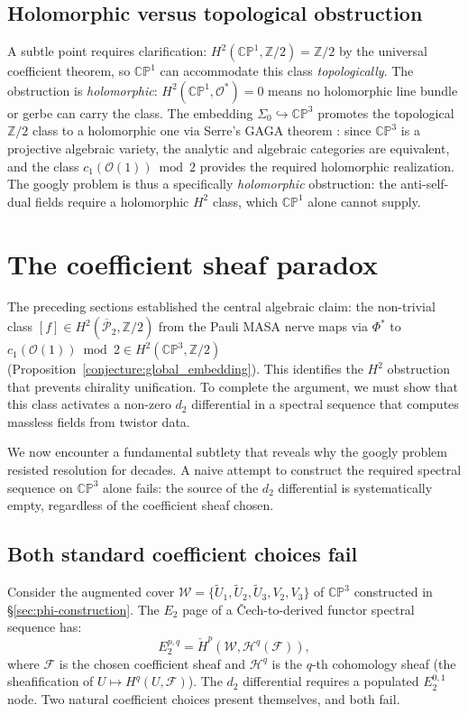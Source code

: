 \documentclass[11pt,a4paper]{article}
\theoremstyle{remark}
\newcommand{\CP}{\mathbb{CP}}
\newcommand{\Z}{\mathbb{Z}}
\newcommand{\cO}{\mathcal{O}}
\newcommand{\barPP}{\overline{\mathcal{P}}}
\begin{document}
\subsection*{Holomorphic versus topological obstruction}
\label{sec:gaga}
A subtle point requires clarification: $H^2(\CP^1, \Z/2) = \Z/2$
by the universal coefficient theorem, so $\CP^1$ can accommodate
this class \emph{topologically}. The obstruction is \emph{holomorphic}:
$H^2(\CP^1, \cO^*) = 0$ means no holomorphic line bundle or gerbe
can carry the class. The embedding $\Sigma_0 \hookrightarrow \CP^3$
promotes the topological $\Z/2$ class to a holomorphic one via
Serre's GAGA theorem \cite{SerreGAGA}: since $\CP^3$ is a projective
algebraic variety, the analytic and algebraic categories are equivalent,
and the class $c_1(\cO(1)) \bmod 2$ provides the required holomorphic
realization. The googly problem is thus a specifically
\emph{holomorphic} obstruction: the anti-self-dual fields require a
holomorphic $H^2$ class, which $\CP^1$ alone cannot supply.

\section[The Coefficient Sheaf Paradox]
  {The coefficient sheaf paradox}
\label{sec:coefficient-paradox}

The preceding sections established the central algebraic claim:
the non-trivial class $[f] \in H^2(\barPP_2, \Z/2)$ from the
Pauli MASA nerve maps via $\Phi^*$ to
$c_1(\cO(1)) \bmod 2 \in H^2(\CP^3, \Z/2)$ (Proposition~\ref{conjecture:global_embedding}).
This identifies the $H^2$ obstruction that prevents chirality
unification. To complete the argument, we must show that this class
activates a non-zero $d_2$ differential in a spectral sequence that
computes massless fields from twistor data.

We now encounter a fundamental subtlety that reveals why the googly
problem resisted resolution for decades. A naive attempt to
construct the required spectral sequence on $\CP^3$ alone fails:
the source of the $d_2$ differential is systematically empty,
regardless of the coefficient sheaf chosen.

\subsection{Both standard coefficient choices fail}

Consider the augmented cover $\mathcal{W} = \{\tilde{U}_1, \tilde{U}_2,
\tilde{U}_3, V_2, V_3\}$ of $\CP^3$ constructed in
\S\ref{sec:phi-construction}. The $E_2$ page of a \v{C}ech-to-derived
functor spectral sequence has:
\[
E_2^{p,q} = \check{H}^p(\mathcal{W}, \mathcal{H}^q(\mathcal{F})),
\]
where $\mathcal{F}$ is the chosen coefficient sheaf and
$\mathcal{H}^q$ is the $q$-th cohomology sheaf (the sheafification
of $U \mapsto H^q(U, \mathcal{F})$). The $d_2$ differential requires
a populated $E_2^{0,1}$ node. Two natural coefficient choices present
themselves, and both fail.
\end{document}
